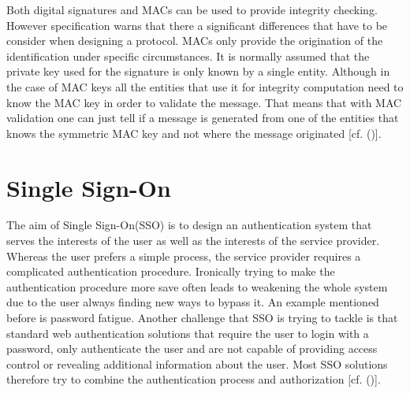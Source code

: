 {{Both digital signatures and MACs can be used to provide integrity checking. However specification warns that there a significant differences that have to be consider when designing a protocol. MACs only provide the origination of the identification under specific circumstances. It is normally assumed that the private key used for the signature is only known by a single entity. Although in the case of MAC keys all the entities that use it for integrity computation need to know the MAC key in order to validate the message. That means that with MAC validation one can just tell if a message is generated from one of the entities that knows the symmetric MAC key and not where the message originated [cf. (\cite{JWT:IETF:Jones:2015})].

\section{Single Sign-On}

The aim of Single Sign-On(SSO) is to design an authentication system that serves the interests of the user as well as the interests of the service provider. Whereas the user prefers a simple process, the service provider requires a complicated authentication procedure. Ironically trying to make the authentication procedure more save often leads to weakening the whole system due to the user always  finding new ways to bypass it. An example mentioned before is password fatigue. Another challenge that SSO is trying to tackle is that standard web authentication solutions that require the user to login with a password, only authenticate the user and are not capable of providing access control or revealing additional information about the user. Most SSO solutions therefore try to combine the authentication process and authorization [cf. (\cite{Prochazka:2010:UCA})].

}}
